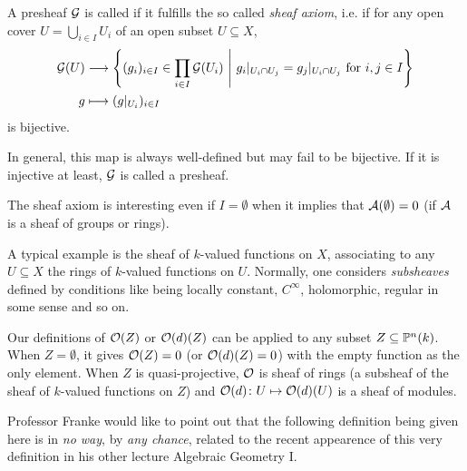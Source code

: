 \documentclass[a4paper,parskip=half,numbers=enddot, DIV=12]{scrreprt}
\begin{document}
\begin{defi}[Sheaf]
    A presheaf $\mathcal{G}$ is called  if it fulfills the so called \emph{sheaf axiom}, i.e. if for any open cover $U = \bigcup_{i\in I} U_i$ of an open subset $U\subseteq X$,
    \begin{align*}
        \Gg(U) &\morphism \left\{(g_i)_{i\in I}\in \prod_{i\in I} \Gg(U_i)\st g_i|_{U_i\cap U_j} = g_j|_{U_i\cap U_j} \text{ for } i,j\in I\right\}\\
        g& \longmapsto (g|_{U_i})_{i\in I}
    \end{align*}
    is bijective. 
    
    In general, this map is always well-defined but may fail to be bijective. If it is injective at least, $\mathcal{G}$ is called a  presheaf.
\end{defi}
\begin{rem}
    \begin{alphanumerate}
        \item 
            The sheaf axiom is interesting even if $I=\emptyset$ when it implies that $\mathcal{A}(\emptyset) = 0$ (if $\mathcal{A}$ is a sheaf of groups or rings).
        \item
            A typical example is the sheaf of $k$-valued functions on $X$, associating to any $U\subseteq X$ the rings of $k$-valued functions on $U$. Normally, one considers \emph{subsheaves} defined by conditions like being locally constant, $C^\infty$, holomorphic, regular in some sense and so on.
        \item 
            Our definitions of $\mathcal{O}(Z)$ or $\mathcal{O}(d)(Z)$ can be applied to any subset $Z\subseteq \mathbb{P}^n(k)$. When $Z=\emptyset$, it gives $\mathcal{O}(Z) = 0$ (or $\mathcal{O}(d)(Z) = 0$) with the empty function as the only element. When $Z$ is quasi-projective, $\mathcal{O}$ is sheaf of rings (a subsheaf of the sheaf of $k$-valued functions on $Z$) and $\mathcal{O}(d)\colon U\mapsto \mathcal{O}(d)(U)$ is a sheaf of modules.
    \end{alphanumerate}
\end{rem}

Professor Franke would like to point out that the following definition being given here is in \emph{no way}, by \emph{any chance}, related to the recent appearence of this very definition in his other lecture Algebraic Geometry I.
\end{document}
